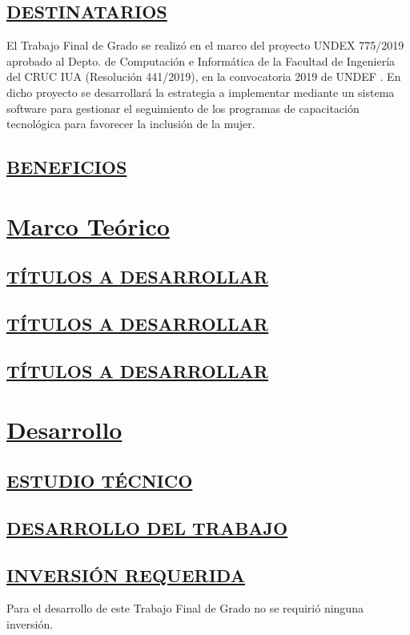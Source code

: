 \section{\underline{DESTINATARIOS}}
El Trabajo Final de Grado se realizó en el marco del proyecto UNDEX 775/2019 aprobado al Depto. de Computación e Informática de la Facultad de Ingeniería del CRUC IUA (Resolución 441/2019), en la convocatoria 2019 de UNDEF \textbf{\cite{ResolucionUndex}}. En dicho proyecto se desarrollará la estrategia a implementar mediante un sistema software para gestionar el seguimiento de los programas de capacitación tecnológica para favorecer la inclusión de la mujer. \\


\section{\underline{BENEFICIOS}}


\chapter{\centering \underline{Marco Teórico}}
\section{\underline{TÍTULOS A DESARROLLAR}}
\section{\underline{TÍTULOS A DESARROLLAR}}
\section{\underline{TÍTULOS A DESARROLLAR}}

\chapter{\centering \underline{Desarrollo}}

\section{\underline{ESTUDIO TÉCNICO}}

\section{\underline{DESARROLLO DEL TRABAJO}}

\section{\underline{INVERSIÓN REQUERIDA}}
Para el desarrollo de este Trabajo Final de Grado no se requirió ninguna inversión.


